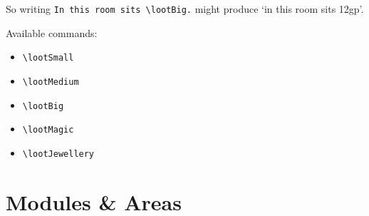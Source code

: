 \documentclass[a4paper,openany]{book}
\begin{document}
\begin{multicols}{2}
So writing \verb"In this room sits \lootBig." might produce `in this room sits 12gp'.

Available commands:

\begin{itemize}

  \item
  \verb"\lootSmall"
  \item
  \verb"\lootMedium"
  \item
  \verb"\lootBig"
  \item
  \verb"\lootMagic"
  \item
  \verb"\lootJewellery"

\end{itemize}

\end{multicols}

\section{Modules \& Areas}
\end{document}
